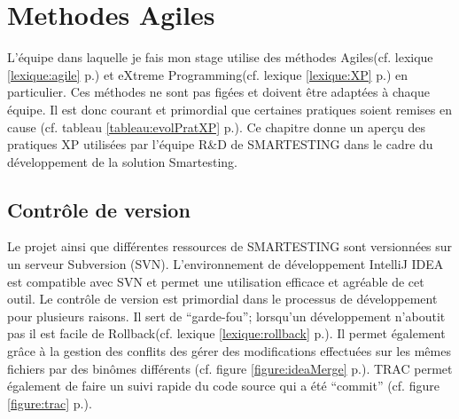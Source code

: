 \chapter{Methodes Agiles}\label{agile}
L'équipe dans laquelle je fais mon stage utilise des méthodes Agiles(cf. lexique \ref{lexique:agile} p.\pageref{lexique:agile}) et eXtreme Programming(cf. lexique \ref{lexique:XP} p.\pageref{lexique:XP}) en particulier. Ces méthodes ne sont pas figées et doivent être adaptées à chaque équipe. Il est donc courant et primordial que certaines pratiques soient remises en cause (cf. tableau \ref{tableau:evolPratXP} p.\pageref{tableau:evolPratXP}). Ce chapitre donne un aperçu des pratiques XP utilisées par l'équipe R\&D de SMARTESTING dans le cadre du développement de la solution Smartesting.


\section{Contrôle de version}
Le projet ainsi que différentes ressources de SMARTESTING sont versionnées sur un serveur Subversion (SVN). L'environnement de développement IntelliJ IDEA est compatible avec SVN et permet une utilisation efficace et agréable de cet outil. Le contrôle de version est primordial dans le processus de développement pour plusieurs raisons. Il sert de ``garde-fou''; lorsqu'un développement n'aboutit pas il est facile de Rollback(cf. lexique \ref{lexique:rollback} p.\pageref{lexique:rollback}). Il permet également grâce à la gestion des conflits des gérer des modifications effectuées sur les mêmes fichiers par des binômes différents (cf. figure \ref{figure:ideaMerge} p.\pageref{figure:ideaMerge}). TRAC permet également de faire un suivi rapide du code source qui a été ``commit'' (cf. figure \ref{figure:trac} p.\pageref{figure:trac}).

